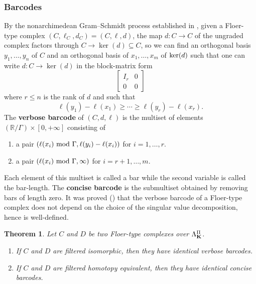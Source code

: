 \documentclass[reqno, 10pt]{amsart}
\numberwithin{equation}{section}
\numberwithin{equation}{section}
\renewcommand{\subset}{\subseteq}
\newtheorem{thm}{Theorem}[section]
\theoremstyle{definition}
\theoremstyle{remark}
\newcommand{\beqn}{\begin{equation*}}
\newcommand{\eeqn}{\end{equation*}}
\newcommand{\mb}{\mathbb}
\begin{document}
\subsubsection{Barcodes}

By the nonarchimedean Gram--Schmidt process established in \cite[Definition 6.3]{Usher_Zhang_2016}, given a Floer-type complex $(C, \ell_C, d_C) = (C, \ell, d)$, the map $d: C \to C$ of the ungraded complex factors through $C \to \ker(d) \subset C$, so we can find an orthogonal basis $y_1, \ldots, y_n$ of $C$ and an orthogonal basis of $x_1, \ldots, x_m$ of ${\rm ker} (d)$ such that one can write $d: C \to \ker(d)$ in the block-matrix form
\beqn
\left[ \begin{array}{cc} I_r & 0 \\
0 & 0 \end{array}\right]
\eeqn
where $r\leq n$ is the rank of $d$ and such that 
\beqn
\ell(y_1) - \ell(x_1) \geq \cdots \geq \ell(y_r) - \ell(x_r).
\eeqn
The {\bf verbose barcode} of $(C, d, \ell)$ is the multiset of elements $({\mb R}/ \Gamma) \times [0, +\infty]$ consisting of
\begin{enumerate}
    \item a pair $(\ell(x_i)\ {\rm mod}\ \Gamma, \ell(y_i) - \ell(x_i))$ for $i=1,\ldots,r$.

    \item a pair $(\ell(x_i)\ {\rm mod}\ \Gamma, \infty)$ for $i = r+1, \ldots, m$.
\end{enumerate}
Each element of this multiset is called a bar while the second variable is called the bar-length. The {\bf concise barcode} is the submultiset obtained by removing bars of length zero. It was proved (\cite[Theorem 7.1]{Usher_Zhang_2016}) that the verbose barcode of a Floer-type complex does not depend on the choice of the singular value decomposition, hence is well-defined. 


\begin{thm}\label{thm_Usher_Zhang_barcodes} Let $C$ and $D$ be two Floer-type complexes over $\Lambda_{\bf K}^\Pi$. 
\begin{enumerate}

\item If $C$ and $D$ are filtered isomorphic, then they have identical verbose barcodes.

\item If $C$ and $D$ are filtered homotopy equivalent, then they have identical concise barcodes.
\end{enumerate}
\end{thm}
\end{document}
